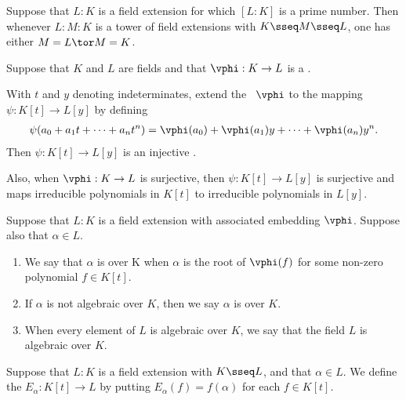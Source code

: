 \documentclass{article}
\begin{document}
  \begin{tcorollary}
    Suppose that $L:K$ is a field extension for which $[L: K]$ is a prime number.
    Then whenever $L : M : K$ is a tower of field extensions with $K \sseq M \sseq L$, one has either $M= L \tor M= K$.
  \end{tcorollary}

  \begin{tproposition}
    Suppose that $K$ and $L$ are fields and that $\vphi : K \to L$ is a \homo.

    With $t$ and $y$ denoting indeterminates, extend the \homo~$ \vphi $ to the mapping $\psi: K[t] \to L[y]$ by defining \begin{align*}
      \psi(a_0 + a_1t+\cdots + a_n t^n) = \vphi(a_0) + \vphi(a_1)y+\cdots + \vphi(a_n)y^n.
    \end{align*}
    Then $ \psi:K[t]\to L[y] $ is an injective \homo.

    Also, when $ \vphi:K\to L $ is surjective, then $\psi: K[t]\to L[y]$ is surjective and maps irreducible polynomials in $K[t]$ to irreducible polynomials in $L[y]$.
  \end{tproposition}

  \begin{tdefinition}
    Suppose that $L: K$ is a field extension with associated embedding $ \vphi $.
    Suppose also that $\alpha\in L$.
\begin{enumerate}[label=(\roman*)]
      \item We say that $ \alpha $ is  over K when $ \alpha $ is the root of $\vphi(f)$ for some non-zero polynomial $f \in K[t]$.
      \item If $\alpha$ is not algebraic over $K$, then we say $ \alpha $ is  over $K$.
      \item When every element of $L$ is algebraic over $K$, we say that the field $L$ is algebraic over $K$.
    \end{enumerate}
  \end{tdefinition}

  \begin{tdefinition}
    Suppose that $L: K$ is a field extension with $K \sseq L$, and that $ \alpha\in L $.
    We define the  $E_\alpha : K[t] \to L$ by putting $E_\alpha(f) = f(\alpha)$ for each $f \in K[t]$.
  \end{tdefinition}
\end{document}

